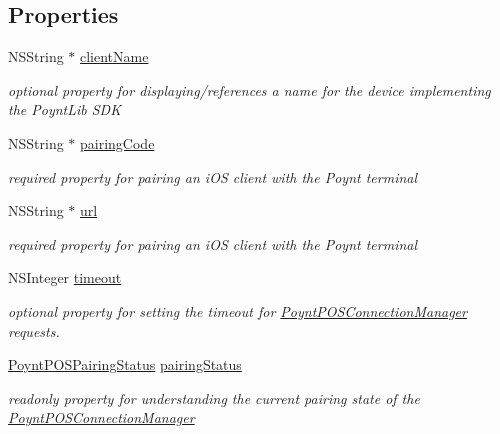 \subsection*{Properties}
\begin{DoxyCompactItemize}
\item 
N\+S\+String $\ast$ \hyperlink{interface_poynt_p_o_s_connection_manager_acc1c5e037cbbc59cd1b00f131660efe2}{client\+Name}
\begin{DoxyCompactList}\small\item\em optional property for displaying/references a name for the device implementing the Poynt\+Lib S\+DK \end{DoxyCompactList}\item 
N\+S\+String $\ast$ \hyperlink{interface_poynt_p_o_s_connection_manager_afb57bf61e0a6b264b5f2765f09a96d2b}{pairing\+Code}
\begin{DoxyCompactList}\small\item\em required property for pairing an i\+OS client with the Poynt terminal \end{DoxyCompactList}\item 
N\+S\+String $\ast$ \hyperlink{interface_poynt_p_o_s_connection_manager_a43481294fa1d2f0ebe7cff14b17726cc}{url}
\begin{DoxyCompactList}\small\item\em required property for pairing an i\+OS client with the Poynt terminal \end{DoxyCompactList}\item 
N\+S\+Integer \hyperlink{interface_poynt_p_o_s_connection_manager_ad4ac67644bd591b45e7e45448681872d}{timeout}
\begin{DoxyCompactList}\small\item\em optional property for setting the timeout for \hyperlink{interface_poynt_p_o_s_connection_manager}{Poynt\+P\+O\+S\+Connection\+Manager} requests. \end{DoxyCompactList}\item 
\hyperlink{_poynt_p_o_s_connection_manager_8h_af6bc4a828ea6541e27d04eef1263513b}{Poynt\+P\+O\+S\+Pairing\+Status} \hyperlink{interface_poynt_p_o_s_connection_manager_ac623b382557bedf15142de86ee6e2782}{pairing\+Status}
\begin{DoxyCompactList}\small\item\em readonly property for understanding the current pairing state of the \hyperlink{interface_poynt_p_o_s_connection_manager}{Poynt\+P\+O\+S\+Connection\+Manager} \end{DoxyCompactList}\item 

\end{DoxyCompactItemize}
